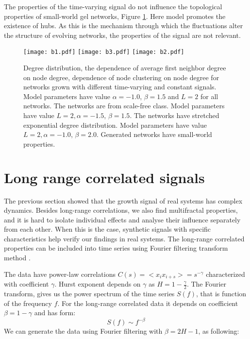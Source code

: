 The properties of the time-varying signal do not influence the topological properties of small-world gel networks, Figure \ref{fig:properties_net}. Here model promotes the existence of hubs. As this is the mechanism through which the fluctuations alter the structure of evolving networks, the properties of the signal are not relevant.   

\begin{figure}[H]
	\centering
	\texttt{[image: b1.pdf]}
	\texttt{[image: b3.pdf]}
	\texttt{[image: b2.pdf]}
	\caption{Degree distribution, the dependence of average first neighbor degree on node degree, dependence of node clustering on node degree for networks grown with different time-varying and constant signals. Model parameters have value $\alpha=-1.0$, $\beta=1.5$  and $L=2$ for all networks. The networks are from scale-free class. Model parameters have value $L=2, \alpha=-1.5$, $\beta=1.5$. The networks have stretched exponential degree distribution. Model parameters have value $ L=2, \alpha=-1.0$, $\beta=2.0$. Generated networks have small-world properties.}
	\label{fig:properties_net}
\end{figure}

\section{Long range correlated signals}

The previous section showed that the growth signal of real systems has complex dynamics. Besides long-range correlations, we also find multifractal properties, and it is hard to isolate individual effects and analyse their influence separately from each other. When this is the case, synthetic signals with specific characteristics help verify our findings in real systems. The long-range correlated properties can be included into time series using Fourier filtering transform method \cite{makse1996method}. 

The data have power-law correlations $C(s)= <x_i x_{i+s}> = s ^ {-\gamma}$ characterized with coefficient $\gamma$. Hurst exponent depends on $\gamma$ as  $H = 1- \frac{\gamma}{2}$. The Fourier transform, gives us the power spectrum of the time series $S(f)$, that is function of the frequency $f$. For the long-range correlated data it depends on coefficient $\beta = 1-\gamma$ and has form:
\begin{equation}
S(f) \sim f^{-\beta}
\end{equation}
We can generate the data using Fourier filtering with $\beta = 2H - 1$, as following:

